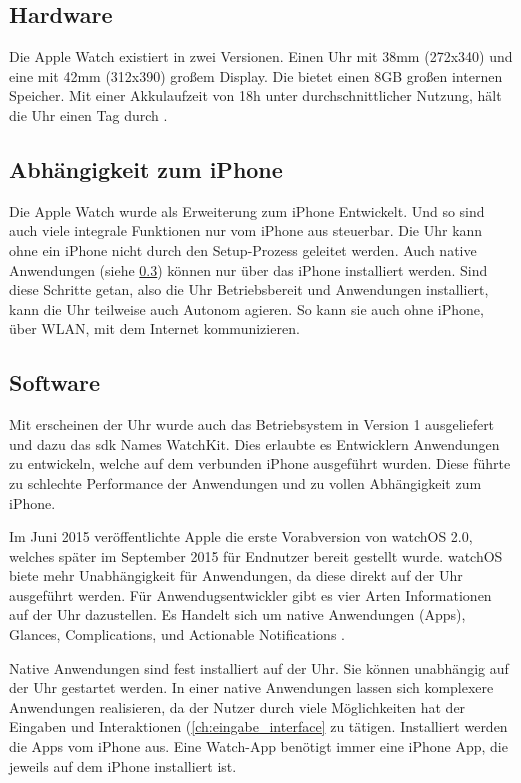 \subsection{Hardware}
Die Apple Watch existiert in zwei Versionen. Einen Uhr mit 38mm (272x340) und eine mit 42mm (312x390) großem Display. Die bietet einen 8GB großen internen Speicher. Mit einer Akkulaufzeit von 18h unter durchschnittlicher Nutzung, hält die Uhr einen Tag durch \cite{Riches:2015aa}. 
\subsection{Abhängigkeit zum iPhone}
Die Apple Watch wurde als Erweiterung zum iPhone Entwickelt. Und so sind auch viele integrale Funktionen nur vom iPhone aus steuerbar. Die Uhr kann ohne ein iPhone nicht durch den Setup-Prozess geleitet werden. Auch native Anwendungen (siehe \ref{ch:watch_software}) können nur über das iPhone installiert werden. Sind diese Schritte getan, also die Uhr Betriebsbereit und Anwendungen installiert, kann die Uhr teilweise auch Autonom agieren. So kann sie auch ohne iPhone, über WLAN, mit dem Internet kommunizieren.

\subsection{Software}
\label{ch:watch_software}
Mit erscheinen der Uhr wurde auch das Betriebsystem in Version 1 ausgeliefert und dazu das \gls{sdk} Names WatchKit. Dies erlaubte es Entwicklern Anwendungen zu entwickeln, welche auf dem verbunden iPhone ausgeführt wurden. Diese führte zu schlechte Performance der Anwendungen und zu vollen Abhängigkeit zum iPhone.

Im Juni 2015 veröffentlichte Apple die erste Vorabversion von watchOS 2.0, welches später im September 2015 für Endnutzer bereit gestellt wurde. watchOS biete mehr Unabhängigkeit für Anwendungen, da diese direkt auf der Uhr ausgeführt werden. Für Anwendugsentwickler gibt es vier Arten Informationen auf der Uhr dazustellen. Es Handelt sich um native Anwendungen (Apps), Glances, Complications, und Actionable Notifications \cite{Apple:2015devAw}.

Native Anwendungen sind fest installiert auf der Uhr. Sie können unabhängig auf der Uhr gestartet werden. In einer native Anwendungen lassen sich komplexere Anwendungen realisieren, da der Nutzer durch viele Möglichkeiten hat der Eingaben und Interaktionen (\ref{ch:eingabe_interface} zu tätigen. Installiert werden die Apps vom iPhone aus. Eine Watch-App benötigt immer eine iPhone App, die jeweils auf dem iPhone installiert ist.

